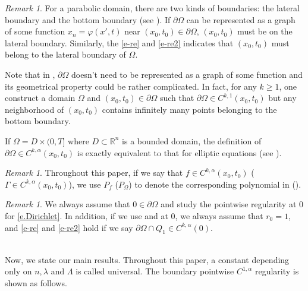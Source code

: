 \documentclass[preprint,12pt]{elsarticle}
\theoremstyle{definition}
\theoremstyle{remark}
\newtheorem{remark}[theorem]{Remark}
\numberwithin{equation}{section}
\begin{document}
\begin{remark}\label{re1.13}
For a parabolic domain, there are two kinds of boundaries: the lateral boundary and the bottom boundary (see \cite{MR1135923}). If $\partial \Omega$ can be represented as a graph of some function $x_n=\varphi(x',t)$ near $(x_0,t_0)\in \partial \Omega$, $(x_0,t_0)$ must be on the lateral boundary. Similarly, the \cref{e-re} and \cref{e-re2} indicates that $(x_0,t_0)$ must belong to the lateral boundary of $\Omega$.

Note that in , $\partial \Omega$ doesn't need to be represented as a graph of some function and its geometrical property could be rather complicated. In fact, for any $k\geq 1$, one construct a domain $\Omega$ and $(x_0,t_0)\in \partial \Omega$ such that $\partial \Omega\in C^{k,1}(x_0,t_0)$ but any neighborhood of $(x_0,t_0)$ contains infinitely many points belonging to the bottom boundary.

If $\Omega=D\times (0,T]$ where $D\subset \mathbb{R}^n$ is a bounded domain, the definition of $\partial \Omega \in C^{k,\alpha}(x_0,t_0)$ is exactly equivalent to that for elliptic equations (see \cite[Definition 1.2]{MR4088470}).
\end{remark}

\begin{remark}\label{re1.2}
Throughout this paper, if we say that $f\in C^{k,\alpha}(x_0,t_0)$ ($\Gamma\in C^{k,\alpha}(x_0,t_0)$), we use $P_f$ ($P_{\Omega}$) to denote the corresponding polynomial in  ().
\end{remark}

\begin{remark}
We always assume that $0\in\partial \Omega$ and study the pointwise regularity at $0$ for \cref{e.Dirichlet}. In addition, if we use  and  at $0$, we always assume that $r_0=1$, and \cref{e-re} and \cref{e-re2} hold if we say $\partial \Omega \cap Q_1\in C^{k,\alpha}(0)$.
\end{remark}
~\\

Now, we state our main results. Throughout this paper, a constant depending only on $n,\lambda$ and $\Lambda$ is called universal. The boundary pointwise $C^{1,\alpha}$ regularity is shown as follows.
\end{document}
